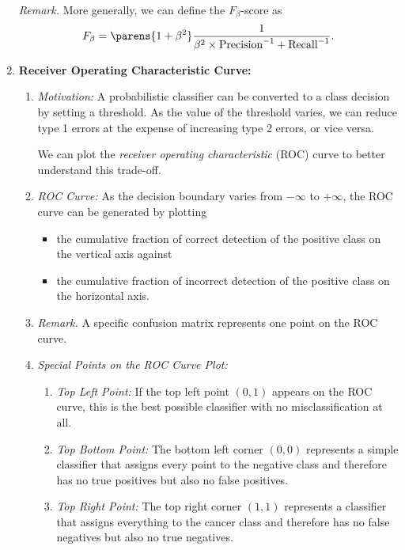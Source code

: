 \documentclass[12pt]{article}
\begin{document}
\begin{enumerate}[label=\textbf{\arabic*.}]
	\textit{Remark.} More generally, we can define the $F_{\beta}$-score as 
	\begin{align*}
		F_{\beta} = \parens{1 + \beta^2} \frac{1}{\beta^2 \times \mathrm{Precision}^{-1} + \mathrm{Recall}^{-1}}. 
	\end{align*}
	
	\item \textbf{Receiver Operating Characteristic Curve:} 
	\begin{enumerate}
		\item \textit{Motivation:} A probabilistic classifier can be converted to a class decision by setting a threshold. As the value of the threshold varies, we can reduce type 1 errors at the expense of increasing type 2 errors, or vice versa. 
		
		We can plot the \emph{receiver operating characteristic} (ROC) curve to better understand this trade-off. 
		
		\item \textit{ROC Curve:} As the decision boundary varies from $-\infty$ to $+\infty$, the ROC curve can be generated by plotting 
		\begin{itemize}
			\item the cumulative fraction of correct detection of the positive class on the vertical axis against 
			\item the cumulative fraction of incorrect detection of the positive class on the horizontal axis. 
		\end{itemize}
		
		\item[] \textit{Remark.} A specific confusion matrix represents one point on the ROC curve. 
		
		\item \textit{Special Points on the ROC Curve Plot:} 
		\begin{enumerate}
			\item \textit{Top Left Point:} If the top left point $(0, 1)$ appears on the ROC curve, this is the best possible classifier with no misclassification at all. 
			\item \textit{Top Bottom Point:} The bottom left corner $(0, 0)$ represents a simple classifier that assigns every point to the negative class and therefore has no true positives but also no false positives. 
			\item \textit{Top Right Point:} The top right corner $(1, 1)$ represents a classifier that assigns everything to the cancer class and therefore has no false negatives but also no true negatives. 			
		\end{enumerate}
		

\end{enumerate}
\end{enumerate}
\end{document}

